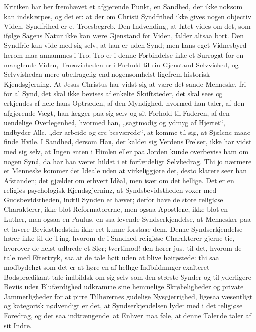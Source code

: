 \documentclass[12pt]{book}
\begin{document}
Kritiken har her fremhævet et afgjørende Punkt, en Sandhed, der ikke
noksom kan indskærpes, og det er: at der om Christi Syndfrihed ikke
gives nogen objectiv Viden. Syndfrihed er et Troesbegreb. Den
Indvending, at Intet vides om det, som ifølge Sagens Natur ikke kan
være Gjenstand for Viden, falder altsaa bort. Den Syndfrie kan vide
med sig selv, at han er uden Synd; men hans eget Vidnesbyrd herom
maa annammes i Tro: Tro er i denne Forbindelse ikke et Surrogat for
en manglende Viden, Troesvisheden er i Forhold til sin Gjenstand
Selvvished, og Selvvisheden mere ubedragelig end nogensomhelst
ligefrem historisk Kjendsgjerning. At Jesus Christus har vidst sig
at være det sande Menneske, fri for al Synd, det skal ikke bevises
af enkelte Skriftsteder, det skal sees og erkjendes af hele hans
Optræden, af den Myndighed, hvormed han taler, af den afgjørende
Vægt, han lægger paa sig selv og sit Forhold til Faderen, af den
uendelige Overlegenhed, hvormed han, „sagtmodig og ydmyg af
Hjertet“, indbyder Alle, „der arbeide og ere besværede“, at komme
til sig, at Sjælene maae finde Hvile. I Sandhed, dersom Han, der
kalder sig Verdens Frelser, ikke har vidst med sig selv, at Ingen
enten i Himlen eller paa Jorden kunde overbevise ham om nogen Synd,
da har han været hildet i et forfærdeligt Selvbedrag. Thi jo
nærmere et Menneske kommer det Ideale uden at virkeliggjøre det,
desto klarere seer han Afstanden; det gjælder om ethvert Idèal, men
især om det hellige.
Det er en religiøs-psychologisk Kjendsgjerning, at Syndsbevidstheden
voxer med Gudsbevidstheden, indtil Synden er hævet; derfor have de
store religiøse Charakterer, ikke blot Reformatorerne, men ogsaa
Apostlene, ikke blot en Luther, men ogsaa en Paulus, en saa levende
Syndserkjendelse, at Mennesker paa et lavere Bevidsthedstrin ikke
ret kunne forstaae dem. Denne Syndserkjendelse hører ikke til de
Ting, hvorom de i Sandhed religiøse Charakterer gjerne tie, hvorover
de helst udbrede et Slør; tvertimod! den hører just til det, hvorom
de tale med Eftertryk, saa at de tale høit uden at blive
høirøstede: thi saa modbydeligt som det er at høre en af hellige
Indbildninger exalteret Bodsprædikant tale indbildsk om sig selv som
den største Synder og til yderligere Beviis uden Blufærdighed
udkramme sine hemmelige Skrøbeligheder og private Jammerligheder for
at pirre Tilhørernes gudelige Nysgjerrighed, ligesaa væsentligt og
kategorisk nødvendigt er det, at Syndserkjendelsen lyder med i det
religiøse Foredrag, og det saa indtrængende, at Enhver maa føle, at
denne Talende taler af sit Indre.
\end{document}

